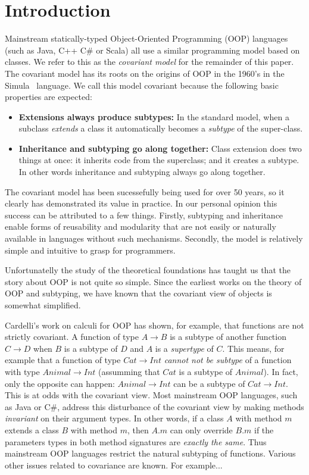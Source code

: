 \section{Introduction}

Mainstream statically-typed Object-Oriented Programming (OOP) languages (such as Java,
C++ C\# or Scala) all use a similar programming model based on
classes. We refer to this as the \emph{covariant model} for the
remainder of this paper. The covariant model has its roots on the
origins of OOP in the 1960's in the Simula~\cite{} language. 
We call this model covariant because the following basic properties are expected:

\begin{itemize}

\item {\bf Extensions always produce subtypes:} In the standard model, when a 
subclass \emph{extends} a class it automatically becomes a 
\emph{subtype} of the super-class. 

\item{\bf Inheritance and subtyping go along together:}
Class extension does two things at once: it inherits code from the
superclass; and it creates a subtype. In other words inheritance and
subtyping always go along together. 

\end{itemize}

The covariant model has been sucessefully being used for over 50 years,
so it clearly has demonstrated its value in practice. In our personal
opinion this success can be attributed to a few things. Firstly,
subtyping and inheritance enable forms of reusability and modularity 
that are not easily or naturally available in languages without such
mechanisms. Secondly, the model is relatively simple and intuitive 
to grasp for programmers. 

Unfortunatelly the study of the theoretical foundations has
taught us that the story about OOP is not quite so simple. Since the
earliest works on the theory of OOP and subtyping, we have known that 
the covariant view of objects is somewhat simplified. 

Cardelli's work on calculi for OOP has shown, for example, that
functions are not strictly covariant.  A function of type $A \to B$ is
a subtype of another function $C \to D$ when $B$ is a subtype of $D$
and $A$ is a \emph{supertype} of $C$. This means, for example that a
function of type $Cat \to Int$ \emph{cannot not be subtype} of a
function with type $Animal \to Int$ (assumming that $Cat$ is a subtype
of $Animal$). In fact, only the opposite can
happen: $Animal \to Int$ can be a subtype of $Cat \to Int$.  This is
at odds with the covariant view. Most mainstream OOP languages, such as Java or C\#, address this
disturbance of the covariant view by making methods \emph{invariant} on 
their argument types. In other words, if a class $A$ with method $m$
extends a class $B$ with method $m$, then $A.m$ can only override 
$B.m$ if the parameters types in both method signatures are \emph{exactly 
the same}. Thus mainstream OOP languages restrict the natural subtyping of
functions. Various other issues related to covariance are known. 
For example...

